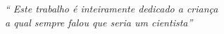 \begin{epigrafe}
	\vspace*{\fill}
	\begin{flushright}
		\textit{``
		Este trabalho é inteiramente dedicado a criança
		\\ a qual sempre falou que seria um cientista''}
	\end{flushright}
\end{epigrafe}
